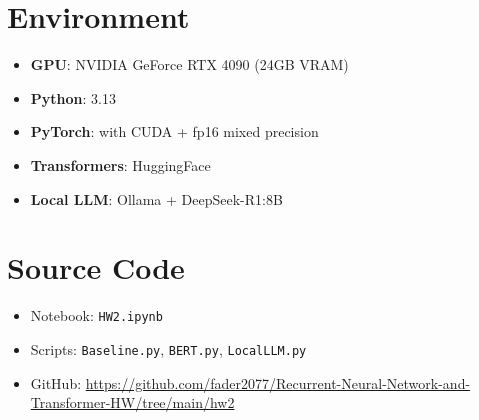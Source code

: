 \documentclass[11pt,a4paper]{article}
\begin{document}
\section*{Environment}

\begin{itemize}[nosep]
\item \textbf{GPU}: NVIDIA GeForce RTX 4090 (24GB VRAM)
\item \textbf{Python}: 3.13
\item \textbf{PyTorch}: with CUDA + fp16 mixed precision
\item \textbf{Transformers}: HuggingFace
\item \textbf{Local LLM}: Ollama + DeepSeek-R1:8B
\end{itemize}

\section*{Source Code}

\begin{itemize}[nosep]
\item Notebook: \texttt{HW2.ipynb}
\item Scripts: \texttt{Baseline.py}, \texttt{BERT.py}, \texttt{LocalLLM.py}
\item GitHub: \url{https://github.com/fader2077/Recurrent-Neural-Network-and-Transformer-HW/tree/main/hw2}
\end{itemize}
\end{document}
